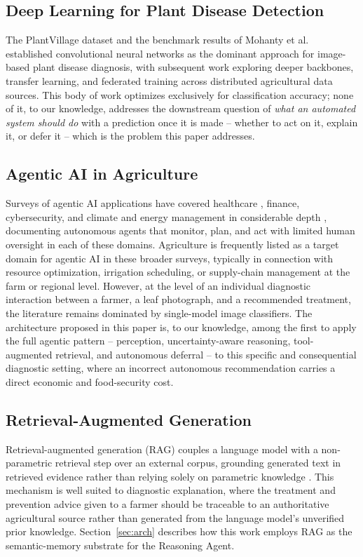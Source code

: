 \documentclass[conference]{IEEEtran}
\begin{document}
\subsection{Deep Learning for Plant Disease Detection}
The PlantVillage dataset \cite{r_hughes2015} and the benchmark results of Mohanty et al.\ \cite{r_mohanty2016} established convolutional neural networks as the dominant approach for image-based plant disease diagnosis, with subsequent work exploring deeper backbones, transfer learning, and federated training across distributed agricultural data sources. This body of work optimizes exclusively for classification accuracy; none of it, to our knowledge, addresses the downstream question of \emph{what an automated system should do} with a prediction once it is made -- whether to act on it, explain it, or defer it -- which is the problem this paper addresses.

\subsection{Agentic AI in Agriculture}
Surveys of agentic AI applications have covered healthcare \cite{b11,b1}, finance, cybersecurity, and climate and energy management in considerable depth \cite{b2,b6,b13}, documenting autonomous agents that monitor, plan, and act with limited human oversight in each of these domains. Agriculture is frequently listed as a target domain for agentic AI in these broader surveys, typically in connection with resource optimization, irrigation scheduling, or supply-chain management at the farm or regional level. However, at the level of an individual diagnostic interaction between a farmer, a leaf photograph, and a recommended treatment, the literature remains dominated by single-model image classifiers. The architecture proposed in this paper is, to our knowledge, among the first to apply the full agentic pattern -- perception, uncertainty-aware reasoning, tool-augmented retrieval, and autonomous deferral -- to this specific and consequential diagnostic setting, where an incorrect autonomous recommendation carries a direct economic and food-security cost.

\subsection{Retrieval-Augmented Generation}
Retrieval-augmented generation (RAG) couples a language model with a non-parametric retrieval step over an external corpus, grounding generated text in retrieved evidence rather than relying solely on parametric knowledge \cite{r_lewis2020}. This mechanism is well suited to diagnostic explanation, where the treatment and prevention advice given to a farmer should be traceable to an authoritative agricultural source rather than generated from the language model's unverified prior knowledge. Section~\ref{sec:arch} describes how this work employs RAG as the semantic-memory substrate for the Reasoning Agent.
\end{document}
